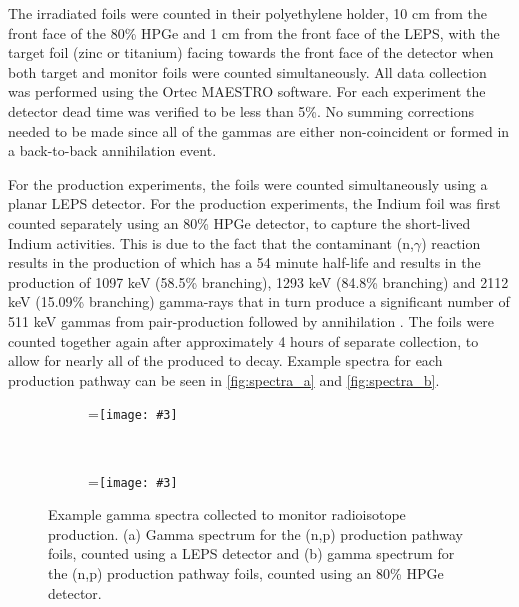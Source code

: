 \documentclass[5p]{elsarticle}
\newcommand{\subfigimg}[3][,]{%
  \setbox1=\hbox{\texttt{[image: \#3]}}%
  \leavevmode\rlap{\usebox1}%
  \rlap{\hspace*{50pt}\raisebox{\dimexpr\ht1-2\baselineskip}{#2}}%
  \phantom{\usebox1}%
}
\begin{document}
The irradiated foils were counted in their polyethylene holder, 10 cm from the front face of the 80\% HPGe and 1 cm from the front face of the LEPS, with the target foil (zinc or titanium) facing towards the front face of the detector when both target and monitor foils were counted simultaneously.
All data collection was performed using the Ortec MAESTRO software.
For each experiment the detector dead time was verified to be less than 5\%.
 No summing corrections needed to be made since all of the gammas are either non-coincident or formed in a back-to-back annihilation event.
 

For the   production experiments, the foils were counted simultaneously using a planar LEPS detector.
For the  production experiments, the Indium foil was first counted separately using an 80\% HPGe detector, to capture the short-lived Indium activities.
This is due to the fact that the contaminant (n,$\gamma$) reaction results in the production of  which has a 54 minute half-life and results in the production of 1097 keV (58.5\% branching), 1293 keV (84.8\% branching) and 2112 keV (15.09\% branching) gamma-rays that in turn produce a significant number of 511 keV gammas from pair-production followed by annihilation \cite{Blachot2010}.
The foils were counted together again after approximately 4 hours of separate collection, to allow for nearly all of the produced  to decay.
Example spectra for each production pathway can be seen in \autoref{fig:spectra_a} and \autoref{fig:spectra_b}.


\begin{figure}[ht]
    \centering
    \begin{subfigure}[t]{\textwidth}
        \centering
        \subfigimg[width=5in]{a)}{./figures/47sc_gspectrum_alt.pdf}
        \label{fig:spectra_a}
    \end{subfigure}%
    \\
    \begin{subfigure}[t]{\textwidth}
        \centering
        \subfigimg[width=5in]{b)}{./figures/64Cu_gspectrum_alt.pdf}
                 \label{fig:spectra_b}
    \end{subfigure}
    \caption{Example gamma spectra collected to monitor radioisotope production. (a)  Gamma spectrum for the (n,p) production pathway foils, counted using a LEPS detector and (b) gamma spectrum for the (n,p) production pathway foils, counted using an 80\% HPGe detector.}
     \label{fig:main_spectra}
\end{figure}
\end{document}
